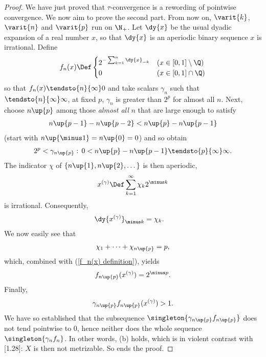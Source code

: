 \begin{proof}
We have just proved that 
%
  $\tau$-convergence is a rewording of pointwise convergence.
%
We now aim to prove the second part.
%
From now on, 
%
  $\varit{k}$, $\varit{n}$ and $\varit{p}$ 
%
run on $\N_+$. Let $\dy{x}$ be the usual dyadic expansion of a real number $x$, 
so that $\dy{x}$ is an aperiodic binary sequence \iif $x$ is irrational. 
%
Define
%
\begin{align}
  \label{f_n(x) definition}
  f_n(x) 
    \Def 
  \begin{cases}
      2^{-\sum_{k= 1}^{n} {\dy{x}_{-k}}} & (x \in [0, 1]\setminus \Q )\\
      0                                            & (x \in [0,1]\cap \Q)
    \end{cases}
\end{align}
%
so that $f_n(x) \tendsto{n}{\infty} 0$
%
and take scalars 
%
  $\gamma_n$ 
%
such that $\tendsto{n}{\infty} \infty$, \ie 
%
  at fixed $p$, $\gamma_{n}$ is greater than $2^{p}$ for almost all $n$.
%
Next, choose $n\up{p}$ among those \textit{almost all} $n$ that are 
large enough to satisfy 
%
  \begin{align}
    n\up{p-1} - n\up{p-2} < n\up{p}- n\up{p-1} 
  \end{align}
%
(start with $n\up{\minus 1} = n\up{0} = 0$) and so obtain 
%
  \begin{align}
    2^p < \gamma_{n\up{p}}:\, 
      0< n\up{p} - n\up{p-1}\tendsto{p}{\infty} \infty.
  \end{align}
%
The indicator $\chi$ of 
%
  $\{n\up{1}, n\up{2}, \dots\}$
%
is then aperiodic, \ie 
%
  \def\xgamma{x^{(\gamma)}}
  \begin{align}
    \xgamma 
      \Def
    \sum_{k=1}^\infty \chi_k 2^{\minus k} 
  \end{align}
is irrational. Consequently,
%
  \begin{align}
    \dy{\xgamma}_{\minus k} &= \chi_{k}.
  \end{align}
%
We now easily see that
%
  \begin{align}
    \chi_1 + \cdots + \chi_{n\up{p}} = p, 
  \end{align}
%
which, combined with (\ref{f_n(x) definition}), yields
%
  \begin{align}
    f_{n\up{p}}(\xgamma) = 2^{\minus p}.
  \end{align}
%
Finally,
%
  \begin{align}
    \gamma_{n\up{p}} f_{n\up{p}}(\xgamma) > 1.
  \end{align}
%
We have so established that the subsequence 
%
  $\singleton{\gamma_{n\up{p}}f_{n\up{p}}}$ 
% 
does not tend pointwise to $0$, hence neither does the whole sequence 
%
  $\singleton{\gamma_{n}f_n}$.
%
In other words, (b) holds, which is in violent contrast with [1.28]: 
$X$ is then not metrizable. So ends the proof.
\end{proof}
